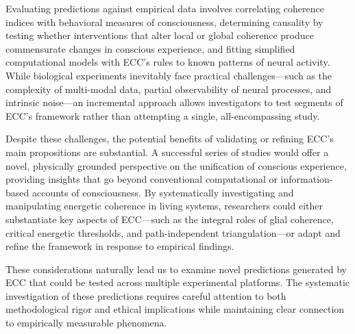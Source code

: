 Evaluating predictions against empirical data involves correlating coherence indices with behavioral measures of consciousness, determining causality by testing whether interventions that alter local or global coherence produce commensurate changes in conscious experience, and fitting simplified computational models with ECC’s rules to known patterns of neural activity. While biological experiments inevitably face practical challenges—such as the complexity of multi-modal data, partial observability of neural processes, and intrinsic noise—an incremental approach allows investigators to test segments of ECC’s framework rather than attempting a single, all-encompassing study.

Despite these challenges, the potential benefits of validating or refining ECC’s main propositions are substantial. A successful series of studies would offer a novel, physically grounded perspective on the unification of conscious experience, providing insights that go beyond conventional computational or information-based accounts of consciousness. By systematically investigating and manipulating energetic coherence in living systems, researchers could either substantiate key aspects of ECC—such as the integral roles of glial coherence, critical energetic thresholds, and path-independent triangulation—or adapt and refine the framework in response to empirical findings.

These considerations naturally lead us to examine novel predictions generated by ECC that could be tested across multiple experimental platforms. The systematic investigation of these predictions requires careful attention to both methodological rigor and ethical implications while maintaining clear connection to empirically measurable phenomena.